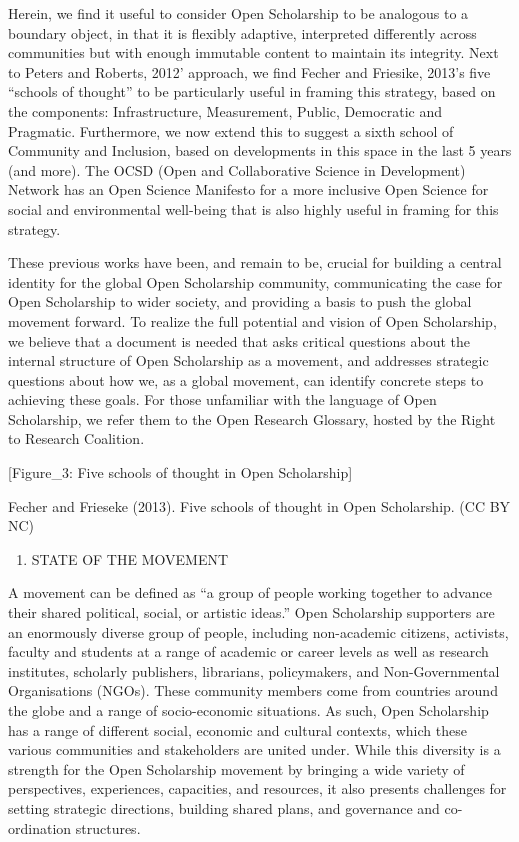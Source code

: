 \documentclass[]{article}
\providecommand{\tightlist}{%
  \setlength{\itemsep}{0pt}\setlength{\parskip}{0pt}}
\begin{document}
Herein, we find it useful to consider Open Scholarship to be analogous
to a boundary object, in that it is flexibly adaptive, interpreted
differently across communities but with enough immutable content to
maintain its integrity. Next to Peters and Roberts, 2012' approach, we
find Fecher and Friesike, 2013's five ``schools of thought'' to be
particularly useful in framing this strategy, based on the components:
Infrastructure, Measurement, Public, Democratic and Pragmatic.
Furthermore, we now extend this to suggest a sixth school of Community
and Inclusion, based on developments in this space in the last 5 years
(and more). The OCSD (Open and Collaborative Science in Development)
Network has an Open Science Manifesto for a more inclusive Open Science
for social and environmental well-being that is also highly useful in
framing for this strategy.

These previous works have been, and remain to be, crucial for building a
central identity for the global Open Scholarship community,
communicating the case for Open Scholarship to wider society, and
providing a basis to push the global movement forward. To realize the
full potential and vision of Open Scholarship, we believe that a
document is needed that asks critical questions about the internal
structure of Open Scholarship as a movement, and addresses strategic
questions about how we, as a global movement, can identify concrete
steps to achieving these goals. For those unfamiliar with the language
of Open Scholarship, we refer them to the Open Research Glossary, hosted
by the Right to Research Coalition.

{[}Figure\_3: Five schools of thought in Open Scholarship{]}

Fecher and Frieseke (2013). Five schools of thought in Open Scholarship.
(CC BY NC)

\begin{enumerate}
\def\labelenumi{\arabic{enumi}.}
\setcounter{enumi}{3}
\tightlist
\item
  STATE OF THE MOVEMENT
\end{enumerate}

A movement can be defined as ``a group of people working together to
advance their shared political, social, or artistic ideas.'' Open
Scholarship supporters are an enormously diverse group of people,
including non-academic citizens, activists, faculty and students at a
range of academic or career levels as well as research institutes,
scholarly publishers, librarians, policymakers, and Non-Governmental
Organisations (NGOs). These community members come from countries around
the globe and a range of socio-economic situations. As such, Open
Scholarship has a range of different social, economic and cultural
contexts, which these various communities and stakeholders are united
under. While this diversity is a strength for the Open Scholarship
movement by bringing a wide variety of perspectives, experiences,
capacities, and resources, it also presents challenges for setting
strategic directions, building shared plans, and governance and
co-ordination structures.
\end{document}
